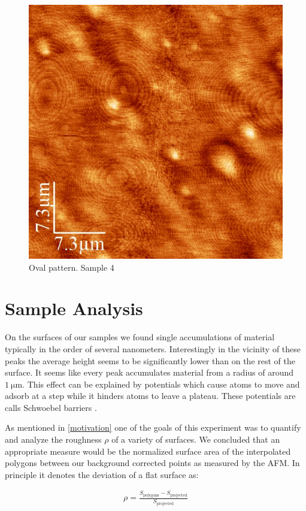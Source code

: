 \documentclass[paper=a4,fontsize=10pt,DIV=18,twocolumn,parskip=half]{scrartcl}
\numberwithin{equation}{section}    %
\begin{document}
\begin{figure}
	\begin{center}
		\includegraphics[width=0.7\columnwidth]{Bilder/artifact3}
		\caption{Oval pattern. Sample \textcircled{4}}
		\label{artifact2}
	\end{center}
\end{figure}


\section{Sample Analysis}

On the surfaces of our samples we found single accumulations of material typically in the order of several nanometers. Interestingly in the vicinity of these peaks the average height seems to be significantly lower than on the rest of the surface. It seems like every peak accumulates material from a radius of around $\SI{1}{\micro\meter}$. This effect can be explained by potentials which cause atoms to move and adsorb at a step while it hinders atoms to leave a plateau. These potentials are calls Schwoebel barriers \cite{merikoski}.


As mentioned in \cref{motivation} one of the goals of this experiment was to 
quantify and analyze the roughness $\rho$ of a variety of surfaces. We concluded 
that an appropriate measure would be the normalized surface area of the 
interpolated polygons between our background corrected points as measured by the 
AFM. In principle it denotes the deviation of a flat surface as:

\begin{align}
    \rho = \frac{S_{\text{polygons}}-S_{\text{projected}}}{S_{\text{projected}}} 
\end{align}
\end{document}
